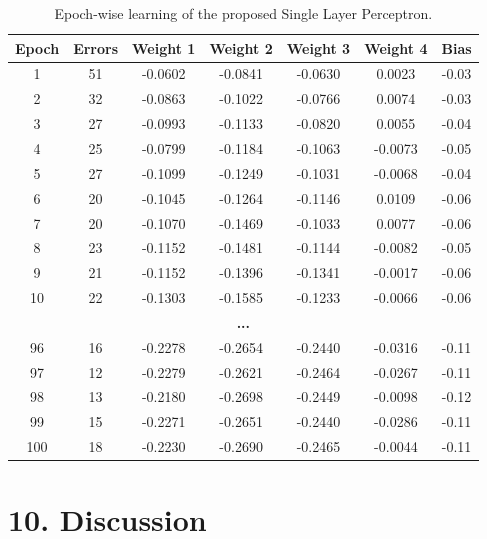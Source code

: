 \documentclass[11pt]{article}
\begin{document}
\begin{table}[H]
\centering
\begin{tabular}{|c|c|c|c|c|c|c|}
\hline
\textbf{Epoch} & \textbf{Errors} & \textbf{Weight 1} & \textbf{Weight 2} & \textbf{Weight 3} & \textbf{Weight 4} & \textbf{Bias} \\
\hline
1  & 51 & -0.0602 & -0.0841 & -0.0630 &  0.0023 & -0.03 \\
2  & 32 & -0.0863 & -0.1022 & -0.0766 &  0.0074 & -0.03 \\
3  & 27 & -0.0993 & -0.1133 & -0.0820 &  0.0055 & -0.04 \\
4  & 25 & -0.0799 & -0.1184 & -0.1063 & -0.0073 & -0.05 \\
5  & 27 & -0.1099 & -0.1249 & -0.1031 & -0.0068 & -0.04 \\
6  & 20 & -0.1045 & -0.1264 & -0.1146 &  0.0109 & -0.06 \\
7  & 20 & -0.1070 & -0.1469 & -0.1033 &  0.0077 & -0.06 \\
8  & 23 & -0.1152 & -0.1481 & -0.1144 & -0.0082 & -0.05 \\
9  & 21 & -0.1152 & -0.1396 & -0.1341 & -0.0017 & -0.06 \\
10 & 22 & -0.1303 & -0.1585 & -0.1233 & -0.0066 & -0.06 \\
\hline
\multicolumn{7}{|c|}{\textbf{...}}\\
\hline
96 & 16 & -0.2278 & -0.2654 & -0.2440 & -0.0316 & -0.11 \\
97 & 12 & -0.2279 & -0.2621 & -0.2464 & -0.0267 & -0.11 \\
98 & 13 & -0.2180 & -0.2698 & -0.2449 & -0.0098 & -0.12 \\
99 & 15 & -0.2271 & -0.2651 & -0.2440 & -0.0286 & -0.11 \\
100 & 18 & -0.2230 & -0.2690 & -0.2465 & -0.0044 & -0.11 \\
\hline
\end{tabular}
\caption{Epoch-wise learning of the proposed Single Layer Perceptron.}
\end{table}


\section*{10. Discussion}
\end{document}
